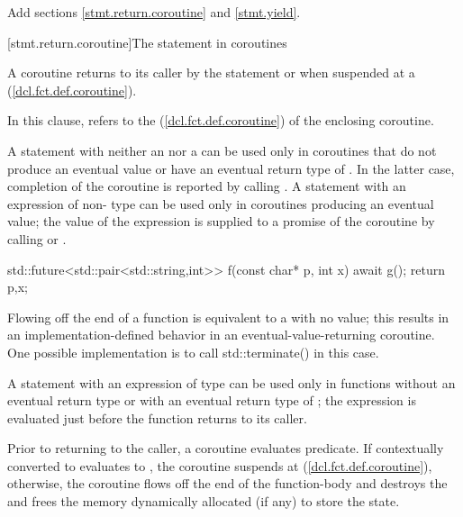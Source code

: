 Add sections \ref{stmt.return.coroutine} and \ref{stmt.yield}.

[stmt.return.coroutine]{The  statement in coroutines}%

\pnum
A coroutine returns to its caller by the  statement
or when suspended at a  (\ref{dcl.fct.def.coroutine}).

\pnum
  In this clause,  refers to the   
  (\ref{dcl.fct.def.coroutine})
  of the enclosing coroutine.
  
\pnum
A  statement
with neither an  nor a 
can be used only in coroutines
that do not produce an eventual value or have an eventual return type of . In the latter case, completion of the coroutine
is reported by calling .
A  statement with an expression of non- type can be used only
in coroutines producing an eventual value; the value of the expression is supplied to a promise of the coroutine by calling 
 or
.

\enterexample

\begin{codeblock}
  std::future<std::pair<std::string,int>> f(const char* p, int x) {
    await g();
    return {p,x};
  }
\end{codeblock}
\exitexample

Flowing off the end of a function is equivalent to a  with
no value; 
this results in an implementation-defined behavior in an eventual-value-returning coroutine.
\enternote
One possible implementation is to call std::terminate() in this case.
\exitnote

\pnum
A  statement with an expression of type 
can be used only in functions without an eventual return type 
or with an eventual return type of ; the expression is evaluated just before the function
returns to its caller.

\pnum
Prior to returning to the caller, a coroutine evaluates
 predicate. If  contextually converted to  evaluates to
, the coroutine suspends at  (\ref{dcl.fct.def.coroutine}),
otherwise, the coroutine flows off the end of the function-body and destroys the  and frees the memory dynamically allocated (if any) to store the state.

